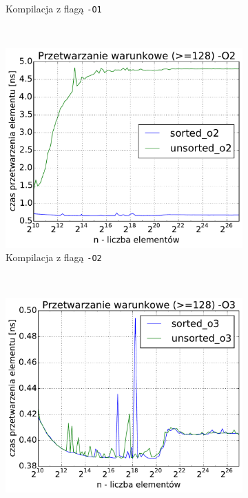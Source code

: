 \begin{figure}
\begin{subfigure}[c]{0.45\textwidth}
        \caption{Kompilacja z flagą \texttt{-O1}}
    \end{subfigure}
    \\
    \vspace{0.55cm}
    \begin{subfigure}[c]{0.45\textwidth}
        \centering
        \includegraphics[width=\textwidth]{images/benchs/filtered_sum_O2}
        \caption{Kompilacja z flagą \texttt{-O2}}
    \end{subfigure}
    ~
    \begin{subfigure}[c]{0.45\textwidth}
        \centering
        \includegraphics[width=\textwidth]{images/benchs/filtered_sum_O3}

\end{subfigure}
\end{figure}
